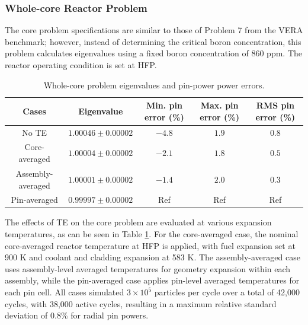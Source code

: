 \subsubsection{Whole-core Reactor Problem}

The core problem specifications are similar to those of Problem 7 from the VERA benchmark; however, instead of determining the critical boron concentration, this problem calculates eigenvalues using a fixed boron concentration of 860 ppm. The reactor operating condition is set at HFP.

\begin{table}
    \centering
    \caption{Whole-core problem eigenvalues and pin-power power errors.}
    \label{tab423} 
    \begin{adjustbox}{width=1.0\textwidth} %
    \begin{tabular}{| c | c | c | c | c |}
    \hline 
    Cases & Eigenvalue & Min. pin error (\%)  & Max. pin error (\%)  & RMS pin error (\%) \\
     \hline
     No TE                & $1.00046 \pm 0.00002$ & $-4.8$ & $1.9$ & $0.8$    \\ \hline
     Core-averaged        & $1.00004 \pm 0.00002$ & $-2.1$ & $1.8$ & $0.5$    \\ \hline
     Assembly-averaged    & $1.00001 \pm 0.00002$ & $-1.4$ & $2.0$ & $0.3$    \\ \hline
     Pin-averaged         & $0.99997 \pm 0.00002$ & Ref    & Ref   & Ref      \\ \hline
    \end{tabular}
    \end{adjustbox}
\end{table}

The effects of TE on the core problem are evaluated at various expansion temperatures, as can be seen in Table \ref{tab423}. For the core-averaged case, the nominal core-averaged reactor temperature at HFP is applied, with fuel expansion set at 900 K and coolant and cladding expansion at 583 K. The assembly-averaged case uses assembly-level averaged temperatures for geometry expansion within each assembly, while the pin-averaged case applies pin-level averaged temperatures for each pin cell. All cases simulated $3\times10^5$ particles per cycle over a total of 42,000 cycles, with 38,000 active cycles, resulting in a maximum relative standard deviation of 0.8\% for radial pin powers.

